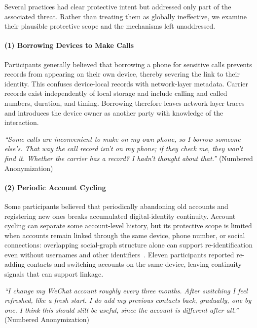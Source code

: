 \documentclass[conference,compsoc]{IEEEtran}
\begin{document}
Several practices had clear protective intent but addressed only part of the associated threat. Rather than treating them as globally ineffective, we examine their plausible protective scope and the mechanisms left unaddressed.

\paragraph{\textbf{(1) Borrowing Devices to Make Calls}}
Participants generally believed that borrowing a phone for sensitive calls prevents records from appearing on their own device, thereby severing the link to their identity. This confuses device-local records with network-layer metadata. Carrier records exist independently of local storage and include calling and called numbers, duration, and timing. Borrowing therefore leaves network-layer traces and introduces the device owner as another party with knowledge of the interaction.

\begin{displayquote}
\textit{``Some calls are inconvenient to make on my own phone, so I borrow someone else's. That way the call record isn't on my phone; if they check me, they won't find it. Whether the carrier has a record? I hadn't thought about that.''} (Numbered Anonymization)
\end{displayquote}

\paragraph{\textbf{(2) Periodic Account Cycling}}
Some participants believed that periodically abandoning old accounts and registering new ones breaks accumulated digital-identity continuity. Account cycling can separate some account-level history, but its protective scope is limited when accounts remain linked through the same device, phone number, or social connections: overlapping social-graph structure alone can support re-identification even without usernames and other identifiers~\cite{narayanan2009anonymizing}. Eleven participants reported re-adding contacts and switching accounts on the same device, leaving continuity signals that can support linkage.

\begin{displayquote}
\textit{``I change my WeChat account roughly every three months. After switching I feel refreshed, like a fresh start. I do add my previous contacts back, gradually, one by one. I think this should still be useful, since the account is different after all.''} (Numbered Anonymization)
\end{displayquote}
\end{document}
